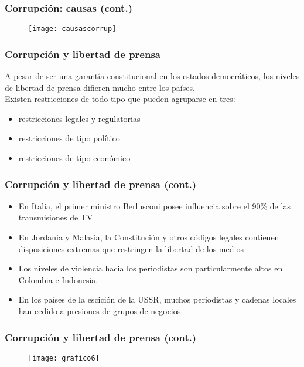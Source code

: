 \documentclass[handout,final,xcolor=dvipsnames]{beamer}
\begin{document}
\begin{frame}\frametitle{Corrupción: causas (cont.)}
\begin{figure}[htbp]
    \centering
    \texttt{[image: causascorrup]}
 \end{figure}
\end{frame}


\begin{frame}\frametitle{Corrupción y libertad de prensa}
A pesar de ser una garantía constitucional en los estados democráticos, los niveles de libertad de prensa difieren mucho entre los países. \\ \medskip 
Existen restricciones de todo tipo que pueden agruparse en tres: \medskip 
\begin{itemize}\itemsep 15pt
\item restricciones legales y regulatorias
\item restricciones de tipo político
\item restricciones de tipo económico
\end{itemize}
\end{frame}


\begin{frame} \frametitle{Corrupción y libertad de prensa (cont.)}
\begin{itemize} \itemsep 10pt
\item En Italia, el primer ministro Berlusconi posee influencia sobre el 90\% de las transmisiones de TV
\item En Jordania y Malasia, la Constitución y otros códigos legales contienen disposiciones
extremas que restringen la libertad de los medios
\item Los niveles de violencia hacia los periodistas son particularmente altos en Colombia e Indonesia.
\item En los países de la escición de la USSR, muchos periodistas y cadenas locales han cedido a presiones de grupos de negocios
\end{itemize}
\end{frame}


\begin{frame} \frametitle{Corrupción y libertad de prensa (cont.)}
\begin{figure}[htbp]
    \centering
    \texttt{[image: grafico6]}
 \end{figure}
\end{frame}
\end{document}
